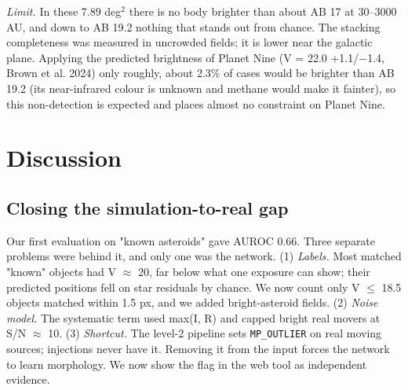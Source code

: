 \documentclass[twocolumn]{aastex631}
\begin{document}
\emph{Limit.} In these 7.89 deg$^2$ there is no body brighter than about AB 17 at 30--3000 AU, and down to AB 19.2 nothing that stands out from chance. The stacking completeness was measured in uncrowded fields; it is lower near the galactic plane. Applying the predicted brightness of Planet Nine (V = 22.0 +1.1/$-$1.4, Brown et al. 2024) only roughly, about 2.3\% of cases would be brighter than AB 19.2 (its near-infrared colour is unknown and methane would make it fainter), so this non-detection is expected and places almost no constraint on Planet Nine.

\section{Discussion}
\label{sec:discussion}
\subsection{Closing the simulation-to-real gap}
Our first evaluation on "known asteroids" gave AUROC 0.66. Three separate problems were behind it, and only one was the network. (1) \emph{Labels.} Most matched "known" objects had V $\approx$ 20, far below what one exposure can show; their predicted positions fell on star residuals by chance. We now count only V $\le$ 18.5 objects matched within 1.5 px, and we added bright-asteroid fields. (2) \emph{Noise model.} The systematic term used max(I, R) and capped bright real movers at S/N $\approx$ 10. (3) \emph{Shortcut.} The level-2 pipeline sets \texttt{MP\_OUTLIER} on real moving sources; injections never have it. Removing it from the input forces the network to learn morphology. We now show the flag in the web tool as independent evidence.
\end{document}
